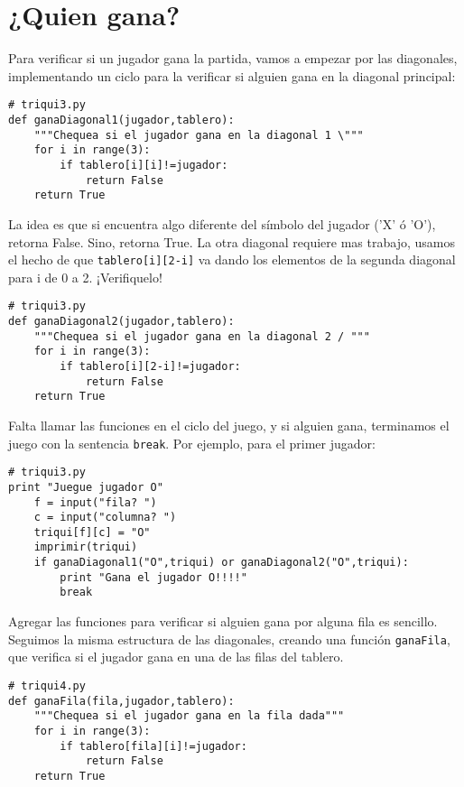 \section{¿Quien gana?}

Para verificar si un jugador gana la partida, vamos a empezar por las diagonales, 
implementando un ciclo para la verificar si alguien gana en la diagonal principal:

\beforeverb
\begin{verbatim}
# triqui3.py
def ganaDiagonal1(jugador,tablero):
    """Chequea si el jugador gana en la diagonal 1 \"""
    for i in range(3):
        if tablero[i][i]!=jugador:
            return False
    return True
\end{verbatim}
\afterverb

La idea es que si encuentra algo diferente del símbolo del jugador ('X' ó 'O'),
retorna False. Sino, retorna True. La otra diagonal requiere mas trabajo, usamos 
el hecho de que \texttt{tablero[i][2-i]} va dando los elementos de la segunda
diagonal para i de 0 a 2. ¡Verifiquelo!

\beforeverb
\begin{verbatim}
# triqui3.py
def ganaDiagonal2(jugador,tablero):
    """Chequea si el jugador gana en la diagonal 2 / """
    for i in range(3):
        if tablero[i][2-i]!=jugador:
            return False
    return True
\end{verbatim}
\afterverb

Falta llamar las funciones en el ciclo del juego, y si alguien gana, terminamos el 
juego con la sentencia \texttt{break}. Por ejemplo, para el primer jugador:

\beforeverb
\begin{verbatim}
# triqui3.py
print "Juegue jugador O"
    f = input("fila? ")
    c = input("columna? ")
    triqui[f][c] = "O"
    imprimir(triqui)
    if ganaDiagonal1("O",triqui) or ganaDiagonal2("O",triqui):
        print "Gana el jugador O!!!!"
        break
\end{verbatim}
\afterverb

Agregar las funciones para verificar si alguien gana por alguna fila es sencillo.
Seguimos la misma estructura de las diagonales, creando una función \texttt{ganaFila}, que
verifica si el jugador gana en una de las filas del tablero.

\beforeverb
\begin{verbatim}
# triqui4.py
def ganaFila(fila,jugador,tablero):
    """Chequea si el jugador gana en la fila dada"""
    for i in range(3):
        if tablero[fila][i]!=jugador:
            return False
    return True
\end{verbatim}
\afterverb

